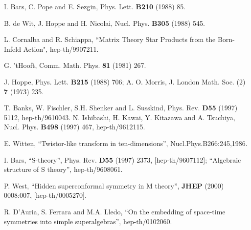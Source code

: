 \documentclass[a4paper,12pt]{article}
\begin{document}
\begin{thebibliography}{99}
  I. Bars, C. Pope and E. Sezgin, Phys. Lett. \textbf{B210}
(1988) 85.

  B. de Wit, J. Hoppe and H. Nicolai, Nucl. Phys. \textbf{B305}
(1988) 545.

  L. Cornalba and R. Schiappa, ``Matrix Theory Star Products
from the Born-Infeld Action", hep-th/9907211.

  G. 'tHooft, Comm. Math. Phys. \textbf{81} (1981) 267.

  J. Hoppe, Phys. Lett. \textbf{B215} (1988) 706; A. O.
Morris, J. London Math. Soc. (2) \textbf{7} (1973) 235.

  T. Banks, W. Fischler, S.H. Shenker and L. Susskind, Phys.
Rev. \textbf{D55} (1997) 5112, hep-th/9610043. \newline
N. Ishibashi, H. Kawai, Y. Kitazawa and A. Tsuchiya, Nucl. Phys. \textbf{B498%
} (1997) 467, hep-th/9612115.

  E. Witten, ``Twistor-like transform in ten-dimensions'',
Nucl.Phys.B266:245,1986.

  I. Bars, ``S-theory'', Phys. Rev. \textbf{D55} (1997)
2373, [hep-th/9607112]; ``Algebraic structure of S theory'', hep-th/9608061.

  P. West, ``Hidden superconformal symmetry in M theory'', 
\textbf{JHEP} (2000) 0008:007, [hep-th/0005270].

  R. D'Auria, S. Ferrara and M.A. Lledo, ``On the embedding
of space-time symmetries into simple superalgebras'', hep-th/0102060.
\end{thebibliography}
\end{document}
